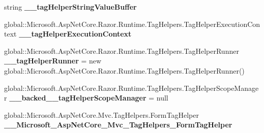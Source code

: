 \begin{DoxyCompactItemize}
\item 
\mbox{\label{class_projeto_e_s_w_1_1_areas_1_1_identity_1_1_pages_1_1_account_1_1_areas___identity___pages___account___register_a60d8cb54f77f23954778499a18ba6335}} 
string {\bfseries \+\_\+\+\_\+tag\+Helper\+String\+Value\+Buffer}
\item 
\mbox{\label{class_projeto_e_s_w_1_1_areas_1_1_identity_1_1_pages_1_1_account_1_1_areas___identity___pages___account___register_a3f669be3802f1d90c8a9b800de6cac55}} 
global\+::\+Microsoft.\+Asp\+Net\+Core.\+Razor.\+Runtime.\+Tag\+Helpers.\+Tag\+Helper\+Execution\+Context {\bfseries \+\_\+\+\_\+tag\+Helper\+Execution\+Context}
\item 
\mbox{\label{class_projeto_e_s_w_1_1_areas_1_1_identity_1_1_pages_1_1_account_1_1_areas___identity___pages___account___register_a28036e9019d9763546c0c0273778b42d}} 
global\+::\+Microsoft.\+Asp\+Net\+Core.\+Razor.\+Runtime.\+Tag\+Helpers.\+Tag\+Helper\+Runner {\bfseries \+\_\+\+\_\+tag\+Helper\+Runner} = new global\+::\+Microsoft.\+Asp\+Net\+Core.\+Razor.\+Runtime.\+Tag\+Helpers.\+Tag\+Helper\+Runner()
\item 
\mbox{\label{class_projeto_e_s_w_1_1_areas_1_1_identity_1_1_pages_1_1_account_1_1_areas___identity___pages___account___register_aa2a811f4e078633f2a7cbb1830a58fc0}} 
global\+::\+Microsoft.\+Asp\+Net\+Core.\+Razor.\+Runtime.\+Tag\+Helpers.\+Tag\+Helper\+Scope\+Manager {\bfseries \+\_\+\+\_\+backed\+\_\+\+\_\+tag\+Helper\+Scope\+Manager} = null
\item 
\mbox{\label{class_projeto_e_s_w_1_1_areas_1_1_identity_1_1_pages_1_1_account_1_1_areas___identity___pages___account___register_a3cd594b676aa0d81e92a5842f397c857}} 
global\+::\+Microsoft.\+Asp\+Net\+Core.\+Mvc.\+Tag\+Helpers.\+Form\+Tag\+Helper {\bfseries \+\_\+\+\_\+\+Microsoft\+\_\+\+Asp\+Net\+Core\+\_\+\+Mvc\+\_\+\+Tag\+Helpers\+\_\+\+Form\+Tag\+Helper}

\end{DoxyCompactItemize}
